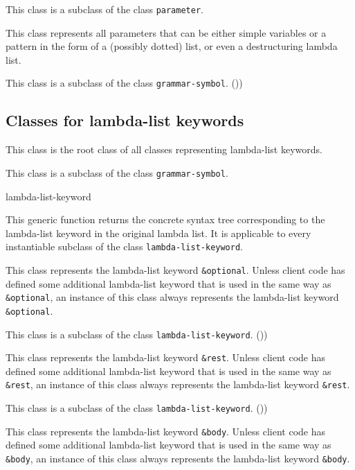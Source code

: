 This class is a subclass of the class \texttt{parameter}.


This class represents all parameters that can be either simple
variables or a pattern in the form of a (possibly dotted) list, or
even a destructuring lambda list.

This class is a subclass of the class \texttt{grammar-symbol}. ())

\subsection{Classes for lambda-list keywords}


This class is the root class of all classes representing lambda-list
keywords.

This class is a subclass of the class \texttt{grammar-symbol}.

 {lambda-list-keyword}

This generic function returns the concrete syntax tree corresponding
to the lambda-list keyword in the original lambda list.  It is
applicable to every instantiable subclass of the class
\texttt{lambda-list-keyword}.


This class represents the lambda-list keyword \texttt{\&optional}.
Unless client code has defined some additional lambda-list keyword
that is used in the same way as \texttt{\&optional}, an instance of
this class always represents the lambda-list keyword
\texttt{\&optional}.

This class is a subclass of the class \texttt{lambda-list-keyword}. ())


This class represents the lambda-list keyword \texttt{\&rest}.
Unless client code has defined some additional lambda-list keyword
that is used in the same way as \texttt{\&rest}, an instance of
this class always represents the lambda-list keyword
\texttt{\&rest}.

This class is a subclass of the class \texttt{lambda-list-keyword}. ())


This class represents the lambda-list keyword \texttt{\&body}.
Unless client code has defined some additional lambda-list keyword
that is used in the same way as \texttt{\&body}, an instance of
this class always represents the lambda-list keyword
\texttt{\&body}.

